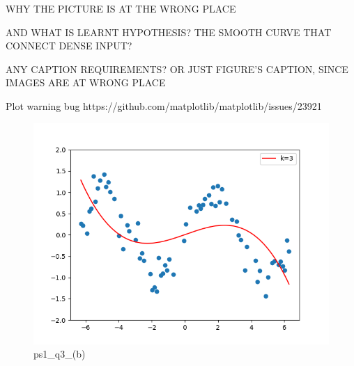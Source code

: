 \begin{answer}

WHY THE PICTURE IS AT THE WRONG PLACE

AND WHAT IS LEARNT HYPOTHESIS? THE SMOOTH CURVE THAT CONNECT DENSE INPUT?

ANY CAPTION REQUIREMENTS? OR JUST FIGURE'S CAPTION, SINCE IMAGES ARE AT WRONG PLACE

Plot warning bug https://github.com/matplotlib/matplotlib/issues/23921

\begin{figure}
    \centering
    \includegraphics[width=0.5\linewidth]{ps1_q3_(b).png}
    \caption{ps1\_q3\_(b)}
    \label{fig:enter-label}
\end{figure}
\end{answer}
